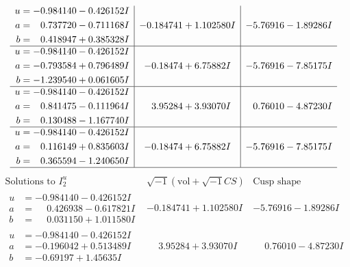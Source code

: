 \documentclass[1p]{elsarticle_modified}
\theoremstyle{definition}
\newcommand{\I}{\sqrt{-1}}
\begin{document}
$$\begin{array}{c|c|c}
\begin{aligned}
u &= -0.984140 - 0.426152 I \\
a &= \phantom{-}0.737720 - 0.711168 I \\
b &= \phantom{-}0.418947 + 0.385328 I\end{aligned}
 & -0.184741 + 1.102580 I & -5.76916 - 1.89286 I \\ \hline\begin{aligned}
u &= -0.984140 - 0.426152 I \\
a &= -0.793584 + 0.796489 I \\
b &= -1.239540 + 0.061605 I\end{aligned}
 & -0.18474 + 6.75882 I & -5.76916 - 7.85175 I \\ \hline\begin{aligned}
u &= -0.984140 - 0.426152 I \\
a &= \phantom{-}0.841475 - 0.111964 I \\
b &= \phantom{-}0.130488 - 1.167740 I\end{aligned}
 & \phantom{-}3.95284 + 3.93070 I & \phantom{-}0.76010 - 4.87230 I \\ \hline\begin{aligned}
u &= -0.984140 - 0.426152 I \\
a &= \phantom{-}0.116149 + 0.835603 I \\
b &= \phantom{-}0.365594 - 1.240650 I\end{aligned}
 & -0.18474 + 6.75882 I & -5.76916 - 7.85175 I\\
 \hline 
 \end{array}$$\newpage$$\begin{array}{c|c|c}  
\text{Solutions to }I^u_{2}& \I (\text{vol} + \sqrt{-1}CS) & \text{Cusp shape}\\
 \hline 
\begin{aligned}
u &= -0.984140 - 0.426152 I \\
a &= \phantom{-}0.426938 - 0.617821 I \\
b &= \phantom{-}0.031150 + 1.011580 I\end{aligned}
 & -0.184741 + 1.102580 I & -5.76916 - 1.89286 I \\ \hline\begin{aligned}
u &= -0.984140 - 0.426152 I \\
a &= -0.196042 + 0.513489 I \\
b &= -0.69197 + 1.45635 I\end{aligned}
 & \phantom{-}3.95284 + 3.93070 I & \phantom{-}0.76010 - 4.87230 I \\ \hline\begin{aligned}

\end{aligned}
\end{array}$$
\end{document}
